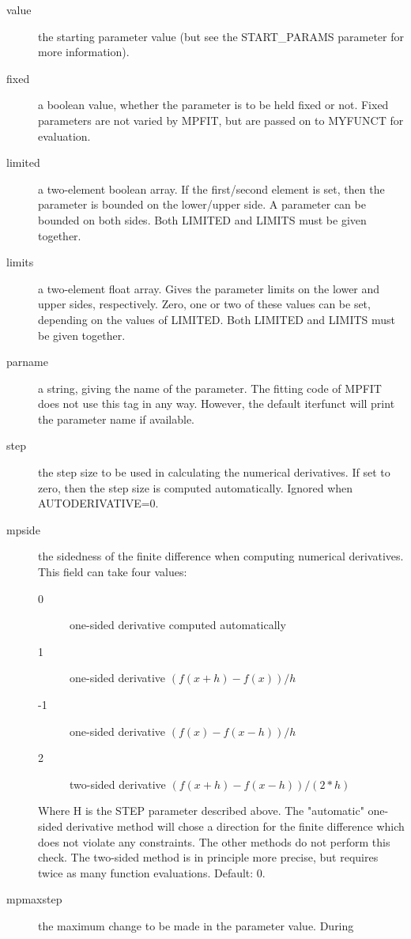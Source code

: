 \documentclass[a4paper,11pt]{scrartcl}
\begin{document}
\begin{description}
  \item[value] the starting parameter value (but see the START\_PARAMS parameter
for more information).
  \item[fixed] a boolean value, whether the parameter is to be held fixed or
not.  Fixed parameters are not varied by MPFIT, but are passed on to MYFUNCT for
evaluation.
  \item[limited] a two-element boolean array.  If the first/second element is
set, then the parameter is bounded on the lower/upper side.  A parameter can be
bounded on both sides.  Both LIMITED and LIMITS must be given together.
  \item[limits] a two-element float array.  Gives the parameter limits on the
lower and upper sides, respectively.  Zero, one or two of these values can be
set, depending on the values of LIMITED.  Both LIMITED and LIMITS must be given
together.
  \item[parname] a string, giving the name of the parameter.  The fitting code
of MPFIT does not use this tag in any way.  However, the default iterfunct will
print the parameter name if available.
  \item[step] the step size to be used in calculating the numerical derivatives.
 If set to zero, then the step size is	computed automatically.  Ignored when
AUTODERIVATIVE=0.
  \item[mpside] the sidedness of the finite difference when computing numerical
derivatives.  This field can take four values:\\
    \begin{description}
      \item [0]one-sided derivative computed automatically
      \item [1]one-sided derivative $(f(x+h) - f(x)  )/h$
      \item [-1] one-sided derivative $(f(x)   - f(x-h))/h$
      \item [2] two-sided derivative $(f(x+h) - f(x-h))/(2*h)$
    \end{description}
	Where H is the STEP parameter described above.  The "automatic"
one-sided derivative method will chose a direction for the finite difference
which does not 			 violate any constraints.  The other methods do
not perform this check.  The two-sided method is in principle more precise, but
requires twice as many function evaluations.  Default: 0.
  \item[mpmaxstep] the maximum change to be made in the parameter value.  During

\end{description}
\end{document}
